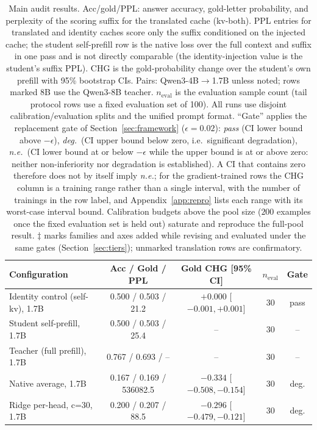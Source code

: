\documentclass{article} %
\begin{document}
\begin{table}[t]
\centering
\caption{Main audit results. Acc/gold/PPL: answer accuracy,
gold-letter probability, and perplexity of the scoring suffix for
the translated cache (kv-both). PPL entries for translated and identity
caches score only the suffix conditioned on the injected cache; the student
self-prefill row is the native loss over the full context and suffix in one
pass and is not directly comparable (the identity-injection value is the
student's suffix PPL). CHG is the gold-probability change
over the student's own prefill with 95\% bootstrap CIs. Pairs:
Qwen3-4B$\to$1.7B unless noted; rows marked 8B use the Qwen3-8B
teacher. $n_{\mathrm{eval}}$ is the evaluation sample count (tail
protocol rows use a fixed evaluation set of 100). All runs use
disjoint calibration/evaluation splits and the unified prompt
format. ``Gate'' applies the replacement gate of
Section~\ref{sec:framework} ($\epsilon{=}0.02$): \emph{pass} (CI lower bound
above $-\epsilon$), \emph{deg.}\ (CI upper bound below zero, i.e.\ significant
degradation), \emph{n.e.}\ (CI lower bound at or below $-\epsilon$ while the
upper bound is at or above zero: neither non-inferiority nor degradation is
established). A CI that contains zero therefore does not by itself imply
\emph{n.e.}; for the gradient-trained rows the CHG column is a training range
rather than a single interval, with the number of trainings in the row label,
and Appendix~\ref{app:repro} lists each range with its worst-case interval
bound. Calibration budgets above the pool size ($200$
examples once the fixed evaluation set is held out) saturate and reproduce the
full-pool result.
$\ddagger$ marks families and axes added while revising and evaluated under the
same gates (Section~\ref{sec:tiers}); unmarked translation rows are
confirmatory.}
\label{tab:main}
\scriptsize
\setlength{\tabcolsep}{3pt}
\begin{tabular}{lcccc}
\toprule
Configuration & Acc / Gold / PPL & Gold CHG [95\% CI] & $n_{\mathrm{eval}}$ & Gate \\
\midrule
Identity control (self-kv), 1.7B & 0.500 / 0.503 / 21.2 & $+0.000$ [$-0.001, +0.001$] & 30 & pass \\
Student self-prefill, 1.7B & 0.500 / 0.503 / 25.4 & -- & 30 & -- \\
Teacher (full prefill), 1.7B & 0.767 / 0.693 / -- & -- & 30 & -- \\
Native average, 1.7B & 0.167 / 0.169 / 536082.5 & $-0.334$ [$-0.508, -0.154$] & 30 & deg. \\
Ridge per-head, c=30, 1.7B & 0.200 / 0.207 / 88.5 & $-0.296$ [$-0.479, -0.121$] & 30 & deg. \\

\end{tabular}
\end{table}
\end{document}
